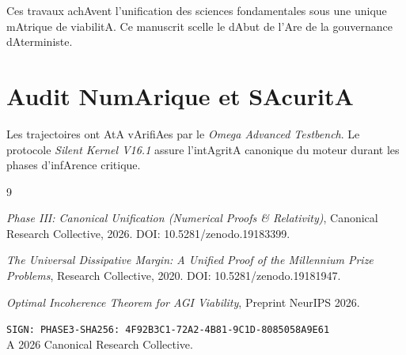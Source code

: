 \documentclass[11pt,a4paper]{amsart}
\begin{document}
Ces travaux achAvent l'unification des sciences fondamentales sous une unique mAtrique de viabilitA. Ce manuscrit scelle le dAbut de l'Are de la gouvernance dAterministe.



\appendix

\section{Audit NumArique et SAcuritA}

Les trajectoires ont AtA vArifiAes par le \emph{Omega Advanced Testbench}. Le protocole \emph{Silent Kernel V16.1} assure l'intAgritA canonique du moteur durant les phases d'infArence critique.



\begin{thebibliography}{9}

 \emph{Phase III: Canonical Unification (Numerical Proofs \& Relativity)}, Canonical Research Collective, 2026. DOI: 10.5281/zenodo.19183399.

 \emph{The Universal Dissipative Margin: A Unified Proof of the Millennium Prize Problems}, Research Collective, 2020. DOI: 10.5281/zenodo.19181947.

 \emph{Optimal Incoherence Theorem for AGI Viability}, Preprint NeurIPS 2026.

\end{thebibliography}



\bigskip

\noindent\texttt{SIGN: PHASE3-SHA256: 4F92B3C1-72A2-4B81-9C1D-8085058A9E61} \\

A 2026 Canonical Research Collective.
\end{document}
